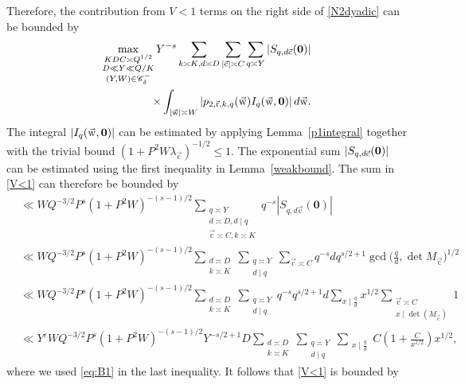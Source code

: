\documentclass[letterpaper,11pt]{amsart}
\numberwithin{equation}{section}
\theoremstyle{definition}
\numberwithin{equation}{section}
\newcommand{\ur}{\vec{\mathrm{r}}}
\newcommand{\uw}{{\vec{\mathrm{w}}}}
\newcommand{\uc}{{\vec{\mathrm{c}}}}
\def\vecnull{{\text{\boldmath$0$}}}
\begin{document}
Therefore, the contribution from $V<1$ terms on the right side of \eqref{N2dyadic} can be bounded by 
\begin{equation}\label{V<1}
\begin{split}
 \max_{\substack{KDC\asymp Q^{1/2}\\ D\ll Y\ll Q/K\\ (Y, W)\in \mathcal C_\delta^-}} Y^{-s} \sum_{k\asymp K, d\asymp D}\sum_{|\uc| \asymp C}\sum_{q\asymp Y}		|S_{q,d\uc}(\vecnull)|\\ \times \int_{|\uw|\asymp W}		
			|p_{2,\ur,k,q}(\uw) I_q(\uw,\vecnull)|
			\,d\uw.
\end{split}
\end{equation}
The integral $|I_q(\uw,\vecnull)|$ can be estimated by applying Lemma~\ref{p1integral} together with the trivial bound $(1+P^2W\lambda_\uc)^{-1/2}\leq 1$. The exponential sum $|S_{q,d\uc}(\vecnull)|$ can be estimated using the first inequality in Lemma~\ref{weakbound}. The sum in \eqref{V<1} can therefore be bounded by
\begin{equation*}
\begin{split}
&\ll W Q^{-3/2}P^{s} (1+P^2W)^{-(s-1)/2}\sum_{\substack{q\asymp Y\\ d\asymp D, d\mid q\\ \uc\asymp C, k \asymp K}}q^{-s}|S_{q, d\uc}(\mathbf{0})|\\
&\ll W Q^{-3/2}P^{s}(1+P^2W)^{-(s-1)/2}\sum_{\substack{d\asymp D\\ k\asymp K}}\sum_{\substack{q\asymp Y\\ d\mid q}}\sum_{\uc\asymp C}q^{-s}dq^{s/2+1}\gcd \big(\frac{q}{d},\det M_{\uc}\big)^{1/2}\\
&\ll W Q^{-3/2}P^{s}(1+P^2W)^{-(s-1)/2}\sum_{\substack{d\asymp D\\ k\asymp K}}\sum_{\substack{q\asymp Y\\ d\mid q}}q^{-s}q^{s/2+1}d\sum_{x\mid \frac{q}{d}}x^{1/2}\sum_{\substack{\uc\asymp C\\ x\mid \det(M_\uc)}}1\\
& \ll Y^\varepsilon WQ^{-3/2}P^{s}(1+P^2W)^{-(s-1)/2}Y^{-s/2+1}D\sum_{\substack{d\asymp D\\ k\asymp K}}\sum_{\substack{q\asymp Y\\ d\mid q}} \sum_{\substack{x\mid \frac{q}{d}}}C(1+\frac{C}{x^{1/2}})x^{1/2},\label{1235,}
\end{split}
\end{equation*}
where we used \eqref{eq:B1} in the last inequality. It follows that \eqref{V<1} is bounded by 
\end{document}
